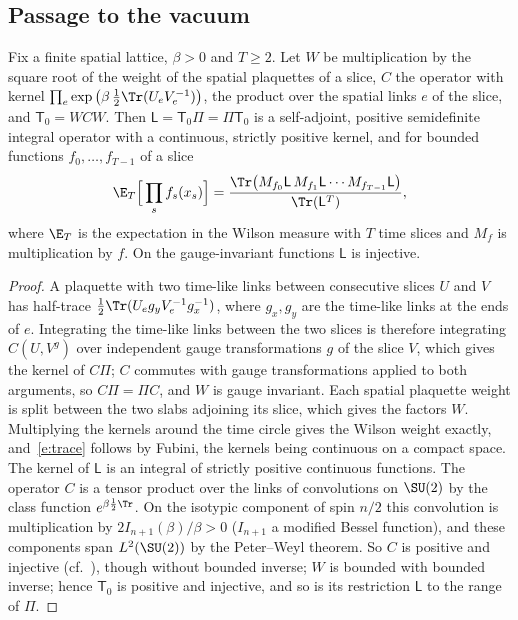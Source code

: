 \subsection{Passage to the vacuum}
\begin{lemma}\label{l:trace}
Fix a finite spatial lattice, $\beta>0$ and $T\ge2$. Let $W$ be multiplication by the square root of the
weight of the spatial plaquettes of a slice, $C$ the operator with kernel
$\prod_e\exp\big(\beta\,\tfrac12\Tr(U_eV_e^{-1})\big)$, the product over the spatial links $e$ of the slice, and
$\mathsf T_0=WCW$. Then $\mathsf L=\mathsf T_0\Pi=\Pi\mathsf T_0$ is a self-adjoint, positive semidefinite
integral operator with a continuous, strictly positive kernel, and for bounded functions
$f_0,\dots,f_{T-1}$ of a slice
\begin{equation}\label{e:trace}
\E_T\Big[\prod_{s}f_s(x_s)\Big]=\frac{\Tr\big(M_{f_0}\mathsf L\,M_{f_1}\mathsf L\cdots M_{f_{T-1}}\mathsf L\big)}{\Tr(\mathsf L^T)},
\end{equation}
where $\E_T$ is the expectation in the Wilson measure with $T$ time slices and $M_f$ is multiplication by
$f$. On the gauge-invariant functions $\mathsf L$ is injective.
\end{lemma}
\begin{proof}
A plaquette with two time-like links between consecutive slices $U$ and $V$ has half-trace
$\tfrac12\Tr(U_eg_yV_e^{-1}g_x^{-1})$, where $g_x,g_y$ are the time-like links at the ends of $e$. Integrating the
time-like links between the two slices is therefore integrating $C(U,V^g)$ over independent gauge
transformations $g$ of the slice $V$, which gives the kernel of $C\Pi$; $C$ commutes with gauge transformations
applied to both arguments, so $C\Pi=\Pi C$, and $W$ is gauge invariant. Each spatial plaquette weight is split
between the two slabs adjoining its slice, which gives the factors $W$. Multiplying the kernels around the
time circle gives the Wilson weight exactly, and~\eqref{e:trace} follows by Fubini, the kernels being
continuous on a compact space. The kernel of $\mathsf L$ is an integral of strictly positive continuous
functions. The operator $C$ is a tensor product over the links of convolutions on $\SU(2)$ by the class function
$e^{\beta\frac12\Tr}$. On the isotypic component of spin $n/2$ this convolution is multiplication by
$2I_{n+1}(\beta)/\beta>0$ ($I_{n+1}$ a modified Bessel function), and these components span $L^2(\SU(2))$ by the
Peter--Weyl theorem. So $C$ is positive and injective (cf.~\cite{Lu77}), though without bounded inverse; $W$ is bounded with bounded inverse; hence
$\mathsf T_0$ is positive and injective, and so is its restriction $\mathsf L$ to the range of $\Pi$.
\end{proof}

